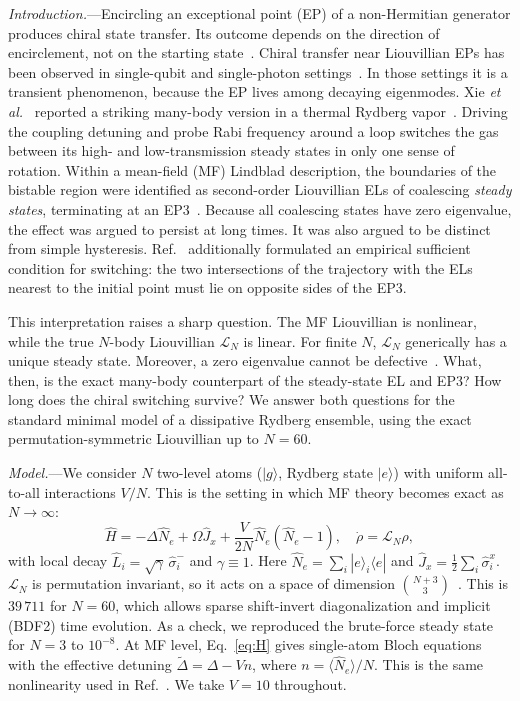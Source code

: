 \documentclass[aps,prl,twocolumn,superscriptaddress,amsmath,amssymb,reprint]{revtex4-2}
\newcommand{\Lc}{\mathcal{L}}
\begin{document}
\emph{Introduction.}---Encircling an exceptional point (EP) of a non-Hermitian generator produces chiral state transfer. Its outcome depends on the direction of encirclement, not on the starting state~\cite{Doppler2016,SunYi2024}. Chiral transfer near Liouvillian EPs has been observed in single-qubit and single-photon settings~\cite{Gao2025}. In those settings it is a transient phenomenon, because the EP lives among decaying eigenmodes. Xie \textit{et al.}~\cite{Xie2025} reported a striking many-body version in a thermal Rydberg vapor~\cite{Carr2013}. Driving the coupling detuning and probe Rabi frequency around a loop switches the gas between its high- and low-transmission steady states in only one sense of rotation. Within a mean-field (MF) Lindblad description, the boundaries of the bistable region were identified as second-order Liouvillian ELs of coalescing \emph{steady states}, terminating at an EP3~\cite{Xie2025,SunYi2024}. Because all coalescing states have zero eigenvalue, the effect was argued to persist at long times. It was also argued to be distinct from simple hysteresis. Ref.~\cite{Xie2025} additionally formulated an empirical sufficient condition for switching: the two intersections of the trajectory with the ELs nearest to the initial point must lie on opposite sides of the EP3.

This interpretation raises a sharp question. The MF Liouvillian is nonlinear, while the true $N$-body Liouvillian $\Lc_N$ is linear. For finite $N$, $\Lc_N$ generically has a unique steady state. Moreover, a zero eigenvalue cannot be defective~\cite{HuBudich2025}. What, then, is the exact many-body counterpart of the steady-state EL and EP3? How long does the chiral switching survive? We answer both questions for the standard minimal model of a dissipative Rydberg ensemble, using the exact permutation-symmetric Liouvillian up to $N=60$.

\emph{Model.}---We consider $N$ two-level atoms ($|g\rangle$, Rydberg state $|e\rangle$) with uniform all-to-all interactions $V/N$. This is the setting in which MF theory becomes exact as $N\to\infty$:
\begin{equation}
\hat H=-\Delta\hat N_e+\Omega\hat J_x+\frac{V}{2N}\hat N_e(\hat N_e-1),\quad
\dot\rho=\Lc_N\rho,
\label{eq:H}
\end{equation}
with local decay $\hat L_i=\sqrt{\gamma}\,\hat\sigma_i^-$ and $\gamma\equiv1$. Here $\hat N_e=\sum_i|e\rangle_i\langle e|$ and $\hat J_x=\frac12\sum_i\hat\sigma_i^x$. $\Lc_N$ is permutation invariant, so it acts on a space of dimension $\binom{N+3}{3}$~\cite{Shammah2018}. This is $39\,711$ for $N=60$, which allows sparse shift-invert diagonalization and implicit (BDF2) time evolution. As a check, we reproduced the brute-force steady state for $N=3$ to $10^{-8}$. At MF level, Eq.~\eqref{eq:H} gives single-atom Bloch equations with the effective detuning $\tilde\Delta=\Delta-Vn$, where $n=\langle\hat N_e\rangle/N$. This is the same nonlinearity used in Ref.~\cite{Xie2025}. We take $V=10$ throughout.
\end{document}

